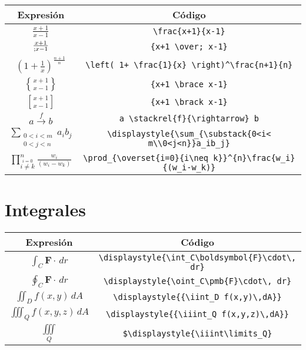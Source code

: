 \documentclass[a4,10pt]{aleph-notas}
\theoremstyle{definition}
\theoremstyle{plain}
\begin{document}
\begin{center}
    \begin{tabular}{|c|c|}
        \hline
        Expresión & Código  \\ \hline
        $\frac{x+1}{x-1}$ & \verb"\frac{x+1}{x-1}" \\ \hline
        ${x+1 \over; x-1}$ & \verb"{x+1 \over; x-1}" \\ \hline
        $\left( 1+ \frac{1}{x} \right)^\frac{n+1}{n}$ & \verb"\left( 1+ \frac{1}{x} \right)^\frac{n+1}{n}" \\ \hline
        ${x+1 \brace x-1}$ & \verb"{x+1 \brace x-1}"\\ \hline
        ${x+1 \brack x-1}$ & \verb"{x+1 \brack x-1}" \\ \hline
        $a \stackrel{f}{\rightarrow} b$ & \verb"a \stackrel{f}{\rightarrow} b" \\ \hline 
        $\displaystyle{\sum_{\substack{0<i< m\\0<j<n}}a_ib_j}$ & \verb"\displaystyle{\sum_{\substack{0<i< m\\0<j<n}}a_ib_j}" \\ \hline 
        $\prod_{\overset{i=0}{i\neq k}}^{n}\frac{w_i}{(w_i-w_k)}$ & \verb"\prod_{\overset{i=0}{i\neq k}}^{n}\frac{w_i}{(w_i-w_k)}"  \\ \hline
    \end{tabular}
\end{center}

\section{Integrales}

\begin{center}
    \begin{tabular}{|c|c|}
        \hline
        Expresión & Código  \\ \hline
        $\displaystyle{\int_C\boldsymbol{F}\cdot\, dr}$ & \verb"\displaystyle{\int_C\boldsymbol{F}\cdot\, dr}" \\ \hline
        $\displaystyle{\oint_C\pmb{F}\cdot\, dr}$ & \verb"\displaystyle{\oint_C\pmb{F}\cdot\, dr}" \\ \hline
        $\displaystyle{{\iint_D f(x,y)\,dA}}$ & \verb"\displaystyle{{\iint_D f(x,y)\,dA}}" \\ \hline
        $\displaystyle{{\iiint_Q f(x,y,z)\,dA}}$ & \verb"\displaystyle{{\iiint_Q f(x,y,z)\,dA}}"\\ \hline
        $\displaystyle{\iiint\limits_Q}$ & \verb"$\displaystyle{\iiint\limits_Q}" \\ \hline
    \end{tabular}
\end{center}
\end{document}
